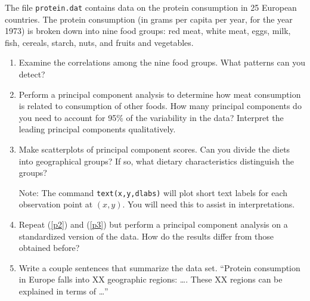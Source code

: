 \documentclass[11pt,titlepage,fleqn]{article}
\begin{document}
The file \verb+protein.dat+ contains data on the protein consumption in 25 European countries. The protein consumption (in grams per capita per year, for the year 1973) is broken down into nine food groups: red meat, white meat, eggs, milk, fish, cereals, starch, nuts, and fruits and vegetables.
%
\begin{enumerate}
\item Examine the correlations among the nine food groups. What patterns can you detect?

\label{p1}

\vertgap
\vertgap

\item Perform a principal component analysis to determine how meat consumption is related to consumption of other foods. How many principal components do you need to account for 95\% of the variability in the data? Interpret the leading principal components qualitatively.

\label{p2}

\vertgap
\vertgap

\item Make scatterplots of principal component scores. Can you divide the diets into geographical groups? If so, what dietary characteristics distinguish the groups?

Note: The command \verb+text(x,y,dlabs)+ will plot short text labels for each observation point at $(x,y)$. You will need this to assist in interpretations.

\label{p3}

\vertgap
\vertgap

\item Repeat (\ref{p2}) and (\ref{p3}) but perform a principal component analysis on a standardized version of the data. How do the results differ from those obtained before?

\vertgap
\vertgap

\item Write a couple sentences that summarize the data set. ``Protein consumption in Europe falls into XX geographic regions: \ldots. These XX regions can be explained in terms of \ldots''

\end{enumerate}

%
\end{document}
